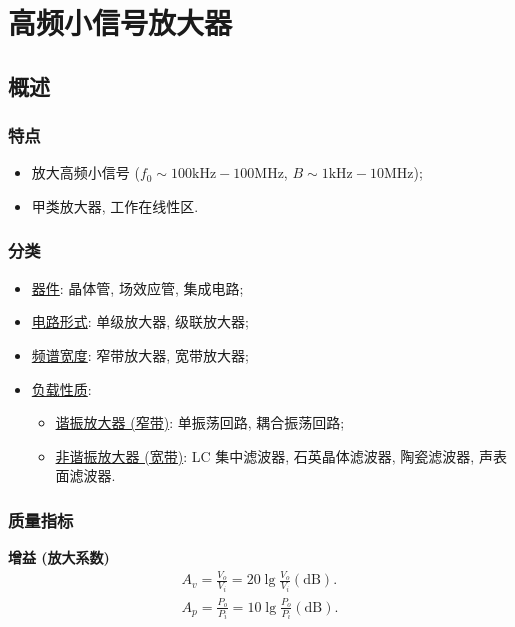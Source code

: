 \section{高频小信号放大器} \label{高频小信号放大器}
\subsection{概述} \label{3 概述}
\subsubsection{特点}

\begin{itemize}
    \item 放大高频小信号 ($f_0\sim 100\mathrm{kHz}-100\mathrm{MHz}$, $B\sim 1\mathrm{kHz}-10\mathrm{MHz}$);
    \item 甲类放大器, 工作在线性区.
\end{itemize}

\subsubsection{分类}
\begin{itemize}
    \item \underline{器件}: 晶体管, 场效应管, 集成电路;
    \item \underline{电路形式}: 单级放大器, 级联放大器;
    \item \underline{频谱宽度}: 窄带放大器, 宽带放大器;
    \item \underline{负载性质}:
          \begin{itemize}
              \item \underline{谐振放大器 (窄带)}: 单振荡回路, 耦合振荡回路;
              \item \underline{非谐振放大器 (宽带)}: LC 集中滤波器, 石英晶体滤波器, 陶瓷滤波器, 声表面滤波器.
          \end{itemize}
\end{itemize}

\subsubsection{质量指标}

\textbf{增益 (放大系数)}
\begin{gather}
    A_v=\frac{V_o}{V_i}=20\lg\frac{V_o}{V_i}(\mathrm{dB}). \\
    A_p=\frac{P_o}{P_i}=10\lg\frac{P_o}{P_i}(\mathrm{dB}).
\end{gather}

